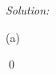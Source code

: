 \documentclass[12pt,a4paper]{article}
\newenvironment{sol}
    {\emph{Solution:}
    }
    {
    \qed
    }
\begin{document}
\begin{sol}
(a)

\end{sol}
\end{document}
